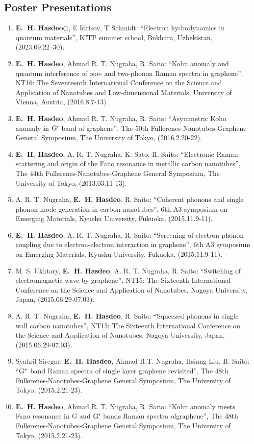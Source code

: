 \documentclass[a4paper,11pt]{article}
\newcommand{\jjm}[5]{\item {#1}: {``#2''}, {#3}, {#5}, (#4).}
\newcommand{\rs}{R. Saito}
\def\Gprime{{\rm G^{\prime}}}
\def\Gstar{\rm G^*}
\def\hes{{\bf E.~H. Hasdeo}}
\begin{document}
\subsection*{Poster Presentations}
\begin{enumerate}
  \jjm{\hes $\bigcirc$, E Idrisov, T Schmidt}
      {Electron hydrodynamics in quantum materials}
      {ICTP summer school}
      {2023.09.22--30}{Bukhara, Uzbekistan}
\jjm{\hes, Ahmad R. T. Nugraha, \rs} 
{Kohn anomaly and quantum interference of one- and two-phonon
Raman spectra in graphene}
{NT16: The Seventeenth International Conference on the Science and Application of
  Nanotubes and Low-dimensional Materials}
{2016.8.7-13}{University of Vienna, Austria}
\jjm{\hes, Ahmad R. T. Nugraha, \rs} 
{Asymmetric Kohn anomaly in $\Gprime$ band of graphene}
{The 50th Fullerenes-Nanotubes-Graphene General Symposium}
{2016.2.20-22}{The University of Tokyo}

\jjm{\hes, A. R. T. Nugraha, K. Sato, \rs}
{Electronic Raman scattering and origin of the Fano resonance in metallic carbon nanotubes}
{The 44th Fullerenes-Nanotubes-Graphene General Symposium}
{2013.03.11-13}{The University of Tokyo}
%
\jjm{A. R. T. Nugraha, \hes, \rs}
{Coherent phonons and single phonon mode generation in carbon nanotubes}
{6th A3 symposium on Emerging Materials}
{2015.11.9-11}{Kyushu University, Fukuoka}
\jjm{\hes, A. R. T. Nugraha, \rs}
{Screening of electron-phonon coupling due to electron-electron interaction in graphene}
{6th A3 symposium on Emerging Materials}
{2015.11.9-11}{Kyushu University, Fukuoka}
\jjm{M. S. Ukhtary, \hes, A. R. T. Nugraha, \rs}
{Switching of electromagnetic wave by graphene}
{NT15: The Sixteenth International Conference on the Science and Application of Nanotubes}
{2015.06.29-07.03}{Nagoya University, Japan}

\jjm{A. R. T. Nugraha, \hes, \rs}
{Squeezed phonons in single wall carbon nanotubes}
{NT15: The Sixteenth International Conference on the Science and Application of Nanotubes}
{2015.06.29-07.03}{Nagoya University, Japan}
\jjm{Syahril Siregar, \hes, Ahmad R.T. Nugraha, Hsiang Liu, \rs} %
{$\Gstar$ band Raman spectra of single layer graphene revisited} 
{The 48th Fullerenes-Nanotubes-Graphene General Symposium}
{2015.2.21-23}{The University of Tokyo}

\jjm{\hes, Ahmad R. T. Nugraha, \rs} %
{Kohn anomaly meets Fano resonance in G and $\Gprime$ bands Raman spectra ofgraphene}
{The 48th Fullerenes-Nanotubes-Graphene General Symposium}
{2015.2.21-23}{The University of Tokyo}


\end{enumerate}
\end{document}
